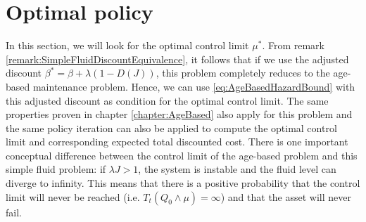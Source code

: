 \section{Optimal policy}
In this section, we will look for the optimal control limit $\mu^*$.
From remark \ref{remark:SimpleFluidDiscountEquivalence}, it follows that if we use the adjusted discount $\beta^*=\beta+\lambda(1-D(J))$, this problem completely reduces to the age-based maintenance problem.
Hence, we can use \eqref{eq:AgeBasedHazardBound} with this adjusted discount as condition for the optimal control limit.
The same properties proven in chapter \ref{chapter:AgeBased} also apply for this problem and the same policy iteration can also be applied to compute the optimal control limit and corresponding expected total discounted cost.
There is one important conceptual difference between the control limit of the age-based problem and this simple fluid problem:
if $\lambda J>1$, the system is instable and the fluid level can diverge to infinity.
This means that there is a positive probability that the control limit will never be reached (i.e. $T_t(Q_0\wedge\mu)=\infty$) and that the asset will never fail.